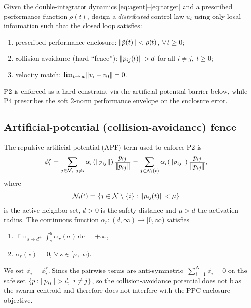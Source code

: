 \begin{problem}
    \label{prob:main}
    Given the double-integrator dynamics
    \eqref{eq:agent}--\eqref{eq:target} and a prescribed performance function
    $\rho(t)$, design a \emph{distributed} control law $u_i$ using
    only local information such that the closed loop satisfies:
    \begin{enumerate}
        \item[\textbf{P4}] prescribed-performance enclosure:
        $\lVert \tilde p(t) \rVert < \rho(t)$, $\forall\, t\ge 0$;
        \item[\textbf{P2}] collision avoidance (hard ``fence''):
        $\lVert p_{ij}(t) \rVert>d$ for all $i\neq j,\ t\ge 0$;
        \item[\textbf{P3}] velocity match:
        $\lim_{t\to\infty}\lVert v_i-v_0 \rVert=0$.
    \end{enumerate}
    P2 is enforced as a hard constraint via the artificial-potential barrier
    below, while P4 prescribes the soft 2-norm performance envelope on the
    enclosure error.
\end{problem}

\subsection{Artificial-potential (collision-avoidance) fence}
\label{subsec:apf}

The repulsive artificial-potential (APF) term used to enforce P2 is
\[
\phi_i^r = \sum_{j \in \mathcal{N},\ j\neq i} \alpha_r(\lVert p_{ij} \rVert)\,
\frac{p_{ij}}{\lVert p_{ij} \rVert}
= \sum_{j \in \mathcal{N}_i(t)} \alpha_r(\lVert p_{ij} \rVert)\,
\frac{p_{ij}}{\lVert p_{ij} \rVert},
\]
where
\[
\mathcal{N}_i(t)=\{j\in\mathcal{N}\setminus\{i\}:\lVert p_{ij}(t) \rVert<\mu\}
\]
is the active neighbor set, $d>0$ is the safety distance and $\mu>d$ the
activation radius. The continuous function
$\alpha_r:(d,\infty)\to[0,\infty)$ satisfies
\begin{enumerate}
    \item[A1.] $\displaystyle\lim_{s\to d^+}\int_s^\mu \alpha_r(\sigma)\,\mathrm{d}\sigma = +\infty$;
    \item[A2.] $\alpha_r(s)=0$, $\forall\, s\in[\mu,\infty)$.
\end{enumerate}
We set $\phi_i=\phi_i^r$. Since the pairwise terms are anti-symmetric,
$\sum_{i=1}^N\phi_i=0$ on the safe set
$\{p:\lVert p_{ij} \rVert>d,\ i\ne j\}$, so the collision-avoidance potential does
not bias the swarm centroid and therefore does not interfere with the PPC
enclosure objective.
